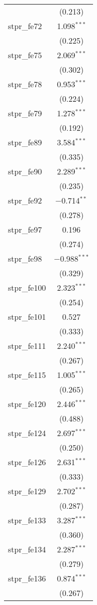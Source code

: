 \begin{table}[!htbp]
\begin{tabular}{@{\extracolsep{5pt}}lc}
  & (0.213) \\ 
  stpr\_fe72 & 1.098$^{***}$ \\ 
  & (0.225) \\ 
  stpr\_fe75 & 2.069$^{***}$ \\ 
  & (0.302) \\ 
  stpr\_fe78 & 0.953$^{***}$ \\ 
  & (0.224) \\ 
  stpr\_fe79 & 1.278$^{***}$ \\ 
  & (0.192) \\ 
  stpr\_fe89 & 3.584$^{***}$ \\ 
  & (0.335) \\ 
  stpr\_fe90 & 2.289$^{***}$ \\ 
  & (0.235) \\ 
  stpr\_fe92 & $-$0.714$^{**}$ \\ 
  & (0.278) \\ 
  stpr\_fe97 & 0.196 \\ 
  & (0.274) \\ 
  stpr\_fe98 & $-$0.988$^{***}$ \\ 
  & (0.329) \\ 
  stpr\_fe100 & 2.323$^{***}$ \\ 
  & (0.254) \\ 
  stpr\_fe101 & 0.527 \\ 
  & (0.333) \\ 
  stpr\_fe111 & 2.240$^{***}$ \\ 
  & (0.267) \\ 
  stpr\_fe115 & 1.005$^{***}$ \\ 
  & (0.265) \\ 
  stpr\_fe120 & 2.446$^{***}$ \\ 
  & (0.488) \\ 
  stpr\_fe124 & 2.697$^{***}$ \\ 
  & (0.250) \\ 
  stpr\_fe126 & 2.631$^{***}$ \\ 
  & (0.333) \\ 
  stpr\_fe129 & 2.702$^{***}$ \\ 
  & (0.287) \\ 
  stpr\_fe133 & 3.287$^{***}$ \\ 
  & (0.360) \\ 
  stpr\_fe134 & 2.287$^{***}$ \\ 
  & (0.279) \\ 
  stpr\_fe136 & 0.874$^{***}$ \\ 
  & (0.267) \\ 

\end{tabular}
\end{table}
